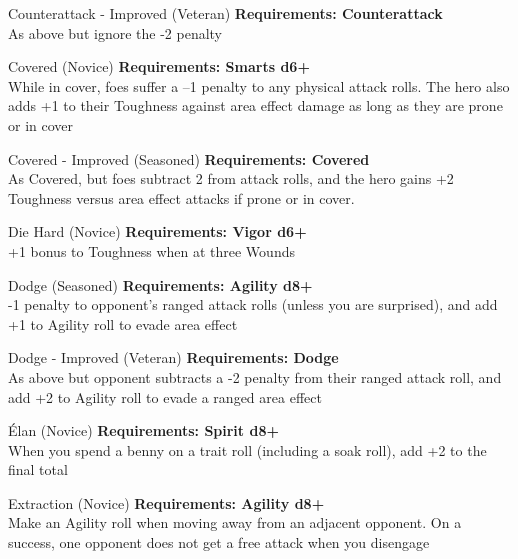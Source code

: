 \begin{multicols}{2}
\begin{genericsection}{Counterattack - Improved (Veteran)}
\textbf{Requirements: Counterattack}\\
As above but ignore the -2 penalty
\end{genericsection}

\begin{genericsection}{Covered (Novice)}
\textbf{Requirements: Smarts d6+}\\
While in cover, foes suffer a –1 penalty to any physical attack rolls. The hero also adds +1 to their Toughness against area effect damage as long as they are prone or in cover
\end{genericsection}

\begin{genericsection}{Covered - Improved (Seasoned)}
\textbf{Requirements: Covered}\\
As Covered, but foes subtract 2 from attack rolls, and the hero gains +2 Toughness versus area effect attacks if prone or in cover.
\end{genericsection}

\begin{genericsection}{Die Hard (Novice)}
\textbf{Requirements: Vigor d6+}\\
+1 bonus to Toughness when at three Wounds
\end{genericsection}

\begin{genericsection}{Dodge (Seasoned)}
\textbf{Requirements: Agility d8+}\\
-1 penalty to opponent's ranged attack rolls (unless you are surprised), and add +1 to Agility roll to evade area effect
\end{genericsection}

\begin{genericsection}{Dodge - Improved (Veteran)}
\textbf{Requirements: Dodge}\\
As above but opponent subtracts a -2 penalty from their ranged attack roll, and add +2 to Agility roll to evade a ranged area effect
\end{genericsection}

\begin{genericsection}{Élan (Novice)}
\textbf{Requirements: Spirit d8+}\\
When you spend a benny on a trait roll (including a soak roll), add +2 to the final total
\end{genericsection}

\begin{genericsection}{Extraction (Novice)}
\textbf{Requirements: Agility d8+}\\
Make an Agility roll when moving away from an adjacent opponent. On a success, one opponent does not get a free attack when you disengage
\end{genericsection}


\end{multicols}
